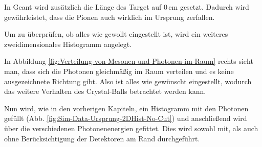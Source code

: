 \documentclass[a4paper,11pt,oneside,final,german,openbib,pdftex]{scrbook}
\begin{document}
{In Geant wird zus\"atzlich die Länge des Target auf $0\,\text{cm}$ gesetzt. Dadurch wird gewährleistet, dass die Pionen auch wirklich im Ursprung zerfallen.




Um zu überprüfen, ob alles wie gewollt eingestellt ist, wird ein weiteres zweidimensionales Histogramm angelegt.



In Abbildung \ref{fig:Verteilung-von-Mesonen-und-Photonen-im-Raum} rechts sieht man, dass sich die Photonen gleichm\"a{\ss}ig im Raum verteilen und es keine ausgezeichnete Richtung gibt. Also ist alles wie gew\"unscht eingestellt, wodurch das weitere Verhalten des Crystal-Balls betrachtet werden kann.

Nun wird, wie in den vorherigen Kapiteln, ein Histogramm mit den Photonen gefüllt (Abb. \ref{fig:Sim-Data-Ursprung-2DHist-No-Cut}) und anschließend wird über die verschiedenen Photonenenergien gefittet. Dies wird sowohl mit, als auch ohne Berücksichtigung der Detektoren am Rand durchgeführt.

}
\end{document}
